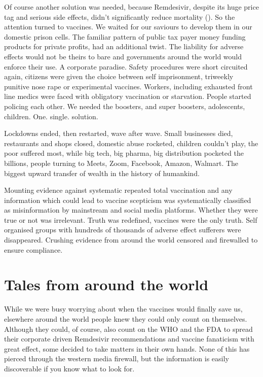 \documentclass[11pt,a4paper]{article}
\begin{document}
Of course another solution was needed, because Remdesivir, despite its huge price tag and serious side effects, didn’t significantly reduce mortality (\cite{Ader21}). So the attention turned to vaccines. We waited for our saviours to develop them in our domestic prison cells. The familiar pattern of public tax payer money funding products for private profits, had an additional twist. The liability for adverse effects would not be theirs to bare and governments around the world would enforce their use. A corporate paradise. Safety procedures were short circuited again, citizens were given the choice between self imprisonment, triweekly punitive nose rape or experimental vaccines. Workers, including exhausted front line medics were faced with obligatory vaccination or starvation. People started policing each other. We needed the boosters, and super boosters, adolescents, children. One. single. solution.

Lockdowns ended, then restarted, wave after wave. Small businesses died, restaurants and shops closed, domestic abuse rocketed, children couldn't play, the poor suffered most, while big tech, big pharma, big distribution pocketed the billions, people turning to Meets, Zoom, Facebook, Amazon, Walmart. The biggest upward transfer of wealth in the history of humankind. 

Mounting evidence against systematic repeated total vaccination and any information which could lead to vaccine scepticism was systematically classified as misinformation by mainstream and social media platforms. Whether they were true or not was irrelevant. Truth was redefined, vaccines were the only truth. Self organised groups with hundreds of thousands of adverse effect sufferers were disappeared. Crushing evidence from around the world censored and firewalled to ensure compliance. 

\section*{Tales from around the world}

While we were busy worrying about when the vaccines would finally save us, elsewhere around the world people knew they could only count on themselves. Although they could, of course, also count on the WHO and the FDA to spread their corporate driven Remdesivir recommendations and vaccine fanaticism with great effect, some decided to take matters in their own hands. None of this has pierced through the western media firewall, but the information is easily discoverable if you know what to look for.
\end{document}

